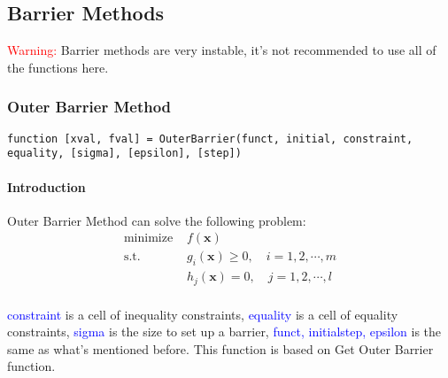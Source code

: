 \documentclass{article}
\begin{document}
\subsection{Barrier Methods}
\textcolor{red}{Warning:} Barrier methods are very instable, it's not recommended to use all of the functions here.

\subsubsection{Outer Barrier Method}
\begin{verbatim}
function [xval, fval] = OuterBarrier(funct, initial, constraint, equality, [sigma], [epsilon], [step])
\end{verbatim}
\paragraph{Introduction}
Outer Barrier Method can solve the following problem:
\begin{align*}
    \mbox{minimize } & f(\mathbf{x}) \\
    \mbox{s.t. } & g_i(\mathbf{x}) \geqslant 0, \quad i = 1, 2, \cdots, m \\
                 & h_j(\mathbf{x}) = 0, \quad j = 1, 2, \cdots, l \\
\end{align*}

\textcolor{blue}{constraint} is a cell of inequality constraints, \textcolor{blue}{equality} is a cell of equality constraints, \textcolor{blue}{sigma} is the size to set up a barrier, \textcolor{blue}{funct, initialstep, epsilon} is the same as what's mentioned before. This function is based on Get Outer Barrier function.
\end{document}
